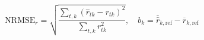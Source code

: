 \documentclass{article}
\begin{document}
\fontsize{22}{29}\selectfont
\[
\mathrm{NRMSE}_{r}=\sqrt{\frac{\sum_{t,k}(\hat r_{tk}-r_{tk})^2}{\sum_{t,k}r_{tk}^2}},\quad b_k=\overline{\hat r}_{k,\mathrm{ref}}-\overline r_{k,\mathrm{ref}}
\]
\end{document}
